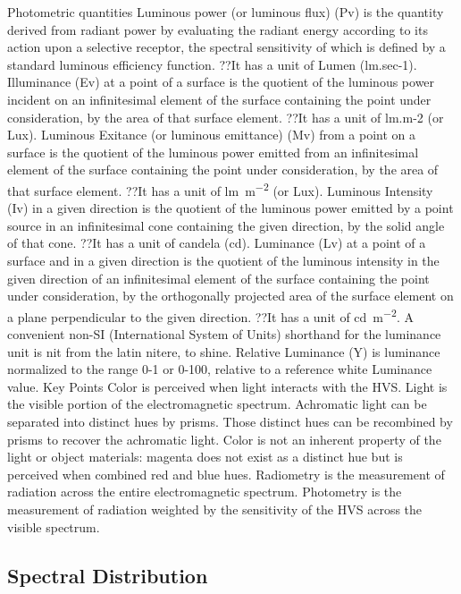 Photometric quantities
Luminous power (or luminous flux) (Pv) is the quantity derived from radiant power by evaluating the radiant energy according to its action upon a selective receptor, the spectral sensitivity of which is defined by a standard luminous efficiency function. ??It has a unit of Lumen (lm.sec-1).
Illuminance (Ev) at a point of a surface is the quotient of the luminous power incident on an infinitesimal element of the surface containing the point under consideration, by the area of that surface element. ??It has a unit of lm.m-2 (or Lux).
Luminous Exitance (or luminous emittance) (Mv) from a point on a surface is the quotient of the luminous power emitted from an infinitesimal element of the surface containing the point under consideration, by the area of that surface element. ??It has a unit of \si{\lumen\per\meter\squared} (or Lux).
Luminous Intensity (Iv) in a given direction is the quotient of the luminous power emitted by a point source in an infinitesimal cone containing the given direction, by the solid angle of that cone. ??It has a unit of candela (cd).
Luminance (Lv) at a point of a surface and in a given direction is the quotient of the luminous intensity in the given direction of an infinitesimal element of the surface containing the point under consideration, by the orthogonally projected area of the surface element on a plane perpendicular to the given direction. ??It has a unit of  \si{\candela\per\meter\squared}. A convenient non-SI (International System of Units) shorthand for the luminance unit is nit from the latin nitere, to shine.
Relative Luminance (Y) is luminance normalized to the range 0-1 or 0-100, relative to a reference white Luminance value.
Key Points
Color is perceived when light interacts with the HVS.
Light is the visible portion of the electromagnetic spectrum.
Achromatic light can be separated into distinct hues by prisms. Those distinct hues can be recombined by prisms to recover the achromatic light.
Color is not an inherent property of the light or object materials:  magenta does not exist as a distinct hue but is perceived when combined red and blue hues.
Radiometry is the measurement of radiation across the entire electromagnetic spectrum.
Photometry is the measurement of radiation weighted by the sensitivity of the HVS across the visible spectrum.

\subsection{Spectral Distribution}%
\label{subsec:spectral-distribution}

